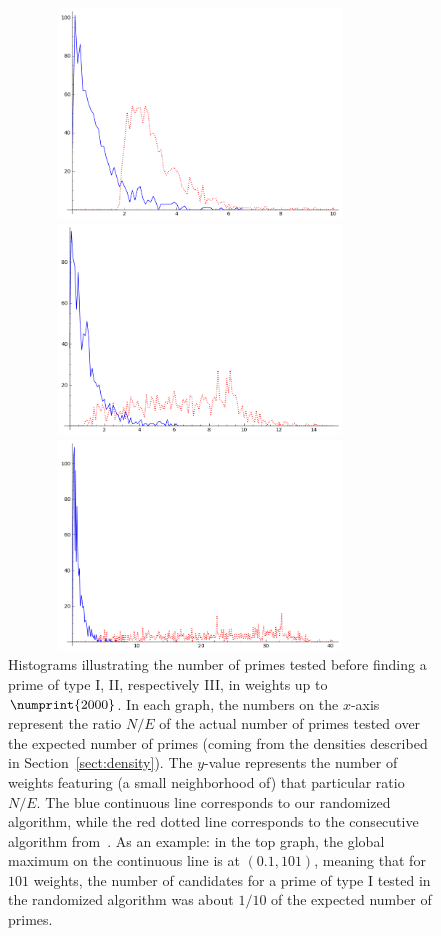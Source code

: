 \documentclass[11pt]{article}
\theoremstyle{plain}
\theoremstyle{definition}
\theoremstyle{remark}
\numberwithin{equation}{section}
\begin{document}
\begin{figure}[h]
\begin{center}
\includegraphics[width=4in, height=2.2in]{type1.png}

\includegraphics[width=4in, height=2.2in]{type2.png}

\includegraphics[width=4in, height=2.2in]{type3.png}
\end{center}
\caption{Histograms illustrating the number of primes tested before finding a
  prime of type I, II, respectively III, in weights up to $\numprint{2000}$.  
  In each graph, the numbers on the
$x$-axis represent the ratio $N/E$ of the actual number of primes tested over
the expected number of primes (coming from the densities described in
Section~\ref{sect:density}).  The $y$-value represents the number of weights
featuring (a small neighborhood of) that particular ratio $N/E$.  The blue 
continuous line corresponds to our randomized algorithm, while the red dotted 
line corresponds to the consecutive algorithm from~\cite{ConreyFarmer}.  
As an example: in the top graph, the global maximum on the continuous line is
at $(0.1, 101)$, meaning that for $101$ weights, the number of candidates for
a prime of type I tested in the randomized algorithm was about $1/10$ of the 
expected number of primes.}
\label{fig:histogram}
\end{figure}
\end{document}
